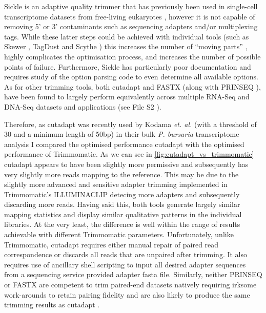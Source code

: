 Sickle is an adaptive quality trimmer that has previously been used in single-cell transcriptome datasets 
from free-living eukaryotes \citep{Kolisko2014}, however it is not capable of removing 
 5' or 3' contaminants such as sequencing adapters and/or multiplexing tags.  
While these latter steps could be achieved with individual tools (such as Skewer \citep{Jiang2014}, 
TagDust \citep{Lassmann2009} and Scythe \citep{Buffalo}) this increases the number of ``moving parts'' 
, highly complicates the optimisation process, and increases the number of possible points of failure.  
Furthermore, Sickle has particularly poor documentation and requires study of the option parsing code to 
even determine all available options.
As for other trimming tools, both cutadapt and FASTX (along with PRINSEQ \citep{Schmieder2011}), 
have been found to largely perform equivalently across multiple RNA-Seq and DNA-Seq datasets and applications 
(see File S2 \citep{DelFabbro2013}).

Therefore, as cutadapt was recently used by Kodama \textit{et. al.} (with a threshold of 30 and a minimum length of 50bp) 
in their bulk \textit{P. bursaria} transcriptome analysis \citep{Kodama2014} I compared the optimised performance 
cutadapt with the optimised performance of Trimmomatic.
As we can see in \ref{fig:cutadapt_vs_trimmomatic} cutadapt appears to have been slightly more permissive
and subsequently has very slightly more reads mapping to the reference.  This may be due to the slightly
more advanced and sensitive adapter trimming implemented in Trimmomatic's ILLUMINACLIP detecing more 
adapters and subsequently discarding more reads.  Having said this, both tools generate largely similar
mapping statistics and display similar qualitative patterns in the individual libraries. 
At the very least, the difference is well within the range of results achievable with different
Trimmomatic parameters.  Unfortunately, unlike Trimmomatic, cutadapt requires either manual repair of 
paired read correspondence or discards all reads that are unpaired after trimming. It also requires
use of ancillary shell scripting to input all desired adapter sequences from a sequencing service
provided adapter fasta file.  Similarly, neither PRINSEQ or FASTX are competent to trim paired-end datasets natively requiring
irksome work-arounds to retain pairing fidelity and are also likely to produce the same trimming 
results as cutadapt \citep{DelFabbro2013}. 


